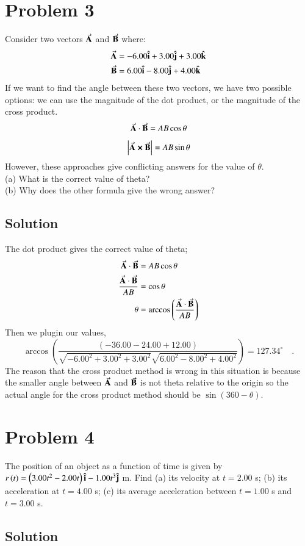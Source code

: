 \documentclass{article}
\begin{document}
\section*{Problem 3}
Consider two vectors $\va A$ and $\va B$ where:
\begin{align*}
	\va A &= -6.00 \vu i + 3.00 \vu j + 3.00 \vu k \\
	\va B &= 6.00 \vu i -8.00 \vu j + 4.00 \vu k
\end{align*}
If we want to find the angle between these two vectors, we have two possible options: we can use the magnitude of the dot product, or the magnitude of the cross product.
\[
	\va A \cdot \va B = AB \cos\theta
\]
\[
	\left| \va A \cross \va B \right| = AB \sin\theta
\]
However, these approaches give conflicting answers for the value of $\theta$. \\
(a) What is the correct value of theta? \\
(b) Why does the other formula give the wrong answer?

\subsection*{Solution}
The dot product gives the correct value of theta;
\begin{align*}
	\va A \cdot \va B &= AB \cos\theta \\
	\frac{\va A \cdot \va B}{AB} &= \cos\theta \\
	\theta &= \arccos\left( \frac{\va A \cdot \va B}{AB} \right)
\end{align*}
Then we plugin our values,
\[
	\arccos\left( \frac{\left( -36.00 - 24.00 + 12.00  \right)}{\sqrt{-6.00^2 + 3.00^2 + 3.00^2} \sqrt{6.00^2 -8.00^2 + 4.00^2}} \right) = 127.34^\circ \quad .
\]
The reason that the cross product method is wrong in this situation is because the smaller angle between $\va A$ and $\va B$ is not theta relative to the origin so the actual angle for the cross product method should be $\sin(360 - \theta)$.

\section*{Problem 4}
The position of an object as a function of time is given by $r\left(t \right) = \left( 3.00t^2 - 2.00t \right)\vu i - 1.00t^3 \vu j$ m. Find (a) its velocity at $t=2.00$ s; (b) its acceleration at $t=4.00$ s; (c) its average acceleration between $t=1.00$ s and $t=3.00$ s.

\subsection*{Solution}
\end{document}
